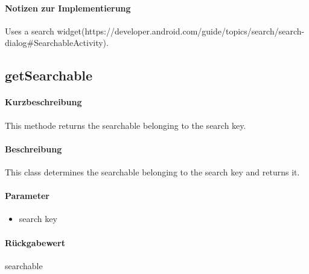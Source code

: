 \paragraph*{Notizen zur Implementierung}
Uses a search widget(https://developer.android.com/guide/topics/search/search-dialog#SearchableActivity).

\subsection{getSearchable}%
\paragraph*{Kurzbeschreibung}
This methode returns the searchable belonging to the search key.
\paragraph*{Beschreibung}
This class determines the searchable belonging to the search key and returns it.
\paragraph*{Parameter}
\begin{itemize}
    \item search key
\end{itemize}
\paragraph*{Rückgabewert}
searchable


